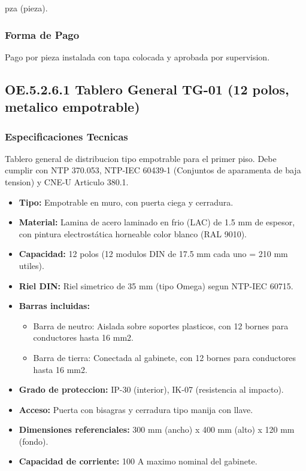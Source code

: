 pza (pieza).

\subsubsection{Forma de Pago}

Pago por pieza instalada con tapa colocada y aprobada por supervision.

\subsection{OE.5.2.6.1 Tablero General TG-01 (12 polos, metalico empotrable)}

\subsubsection{Especificaciones Tecnicas}

Tablero general de distribucion tipo empotrable para el primer piso. Debe cumplir con NTP 370.053, NTP-IEC 60439-1 (Conjuntos de aparamenta de baja tension) y CNE-U Articulo 380.1.

\begin{itemize}[nosep]
  \item \textbf{Tipo:} Empotrable en muro, con puerta ciega y cerradura.
  \item \textbf{Material:} Lamina de acero laminado en frio (LAC) de 1.5 mm de espesor, con pintura electrostática horneable color blanco (RAL 9010).
  \item \textbf{Capacidad:} 12 polos (12 modulos DIN de 17.5 mm cada uno = 210 mm utiles).
  \item \textbf{Riel DIN:} Riel simetrico de 35 mm (tipo Omega) segun NTP-IEC 60715.
  \item \textbf{Barras incluidas:}
  \begin{itemize}
    \item Barra de neutro: Aislada sobre soportes plasticos, con 12 bornes para conductores hasta 16 mm2.
    \item Barra de tierra: Conectada al gabinete, con 12 bornes para conductores hasta 16 mm2.
  \end{itemize}
  \item \textbf{Grado de proteccion:} IP-30 (interior), IK-07 (resistencia al impacto).
  \item \textbf{Acceso:} Puerta con bisagras y cerradura tipo manija con llave.
  \item \textbf{Dimensiones referenciales:} 300 mm (ancho) x 400 mm (alto) x 120 mm (fondo).
  \item \textbf{Capacidad de corriente:} 100 A maximo nominal del gabinete.
\end{itemize}

